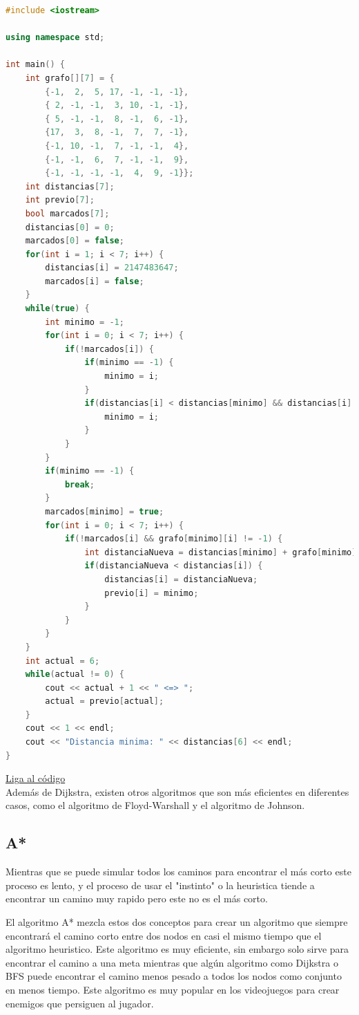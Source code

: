 \documentclass{article}
\begin{document}
\begin{lstlisting}[language=C++, title=Algoritmo de Dijkstra]
#include <iostream>

using namespace std;

int main() {
	int grafo[][7] = {
		{-1,  2,  5, 17, -1, -1, -1},
		{ 2, -1, -1,  3, 10, -1, -1},
		{ 5, -1, -1,  8, -1,  6, -1},
		{17,  3,  8, -1,  7,  7, -1},
		{-1, 10, -1,  7, -1, -1,  4},
		{-1, -1,  6,  7, -1, -1,  9},
		{-1, -1, -1, -1,  4,  9, -1}};
	int distancias[7];
	int previo[7];
	bool marcados[7];
	distancias[0] = 0;
	marcados[0] = false;
	for(int i = 1; i < 7; i++) {
		distancias[i] = 2147483647;
		marcados[i] = false;
	}
	while(true) {
		int minimo = -1;
		for(int i = 0; i < 7; i++) {
			if(!marcados[i]) {
				if(minimo == -1) {
					minimo = i;
				}
				if(distancias[i] < distancias[minimo] && distancias[i] != 2147483647) {
					minimo = i;
				}
			}
		}
		if(minimo == -1) {
			break;
		}
		marcados[minimo] = true;
		for(int i = 0; i < 7; i++) {
			if(!marcados[i] && grafo[minimo][i] != -1) {
				int distanciaNueva = distancias[minimo] + grafo[minimo][i];
				if(distanciaNueva < distancias[i]) {
					distancias[i] = distanciaNueva;
					previo[i] = minimo;
				}
			}
		}
	}
	int actual = 6;
	while(actual != 0) {
		cout << actual + 1 << " <=> ";
		actual = previo[actual];
	}
	cout << 1 << endl;
	cout << "Distancia minima: " << distancias[6] << endl;
}
\end{lstlisting}
\href{https://repl.it/@Jamesscn/Algoritmo-de-Dijkstra}{Liga al código} \\

Además de Dijkstra, existen otros algoritmos que son más eficientes en diferentes casos, como el algoritmo de Floyd-Warshall y el algoritmo de Johnson.

\subsection{A*}

Mientras que se puede simular todos los caminos para encontrar el más corto este proceso es lento, y el proceso de usar el "instinto" o la heuristica tiende a encontrar un camino muy rapido pero este no es el más corto.

El algoritmo A* mezcla estos dos conceptos para crear un algoritmo que siempre encontrará el camino corto entre dos nodos en casi el mismo tiempo que el algoritmo heuristico. Este algoritmo es muy eficiente, sin embargo solo sirve para encontrar el camino a una meta mientras que algún algoritmo como Dijkstra o BFS puede encontrar el camino menos pesado a todos los nodos como conjunto en menos tiempo. Este algoritmo es muy popular en los videojuegos para crear enemigos que persiguen al jugador.
\end{document}
